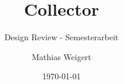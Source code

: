 \title [Collector] {Collector}										%
\subtitle [Semesterarbeit] {Design Review - Semesterarbeit}				%

\author[M. Weigert] {Mathias Weigert}								%

\date{\today}														%


\subject{Kick Off Semesterarbeit}									%
